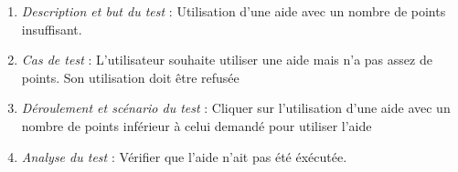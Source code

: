 \documentclass [ 11 pt ] {article}
\begin{document}
        \begin{tcolorbox}[colback=negatifC]
            \begin{enumerate}
                \item \textit{Description et but du test} : Utilisation d'une aide avec un nombre de points insuffisant.\newline
                
                \item \textit{Cas de test} : L'utilisateur souhaite utiliser une aide mais n'a pas assez de points. Son utilisation doit être refusée  \newline
                
                \item \textit{Déroulement et scénario du test} : Cliquer sur l'utilisation d'une aide avec un nombre de points inférieur à celui demandé pour utiliser l'aide \newline
                
                \item \textit{Analyse du test} : Vérifier que l'aide n'ait pas été éxécutée.
            \end{enumerate}
        \end{tcolorbox}
\end{document}
